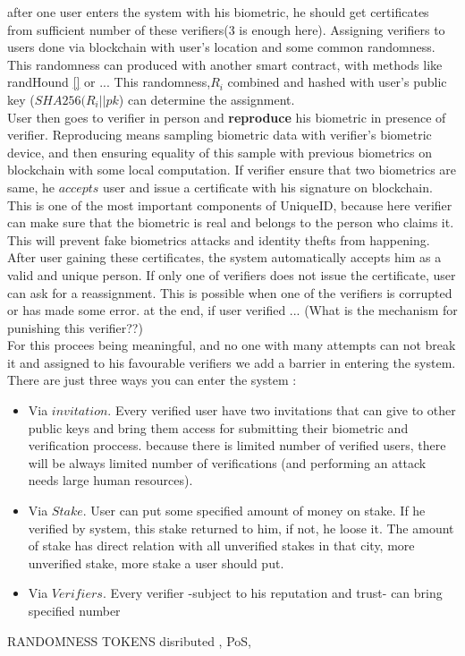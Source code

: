 \documentclass{article}
\begin{document}
 after one user enters the system with his biometric, he should get certificates from sufficient number of these verifiers(3 is enough here). Assigning verifiers to users done via blockchain with user's location and some common randomness. This randomness can produced with another smart contract, with methods like randHound \ref{} or ...   This randomness,$ R_i$ combined and hashed with user's public key ($SHA256(R_i || pk$) can determine the assignment. \\ 
User then goes to verifier in person and \textbf{reproduce}  his biometric in presence of verifier. Reproducing means sampling biometric data with verifier's biometric device, and then ensuring equality of this sample with previous biometrics on blockchain with some local computation. If verifier ensure that two biometrics are same, he $accepts$ user and issue a certificate with his signature on blockchain. This is one of the most important components of UniqueID, because here verifier can make sure that the biometric is real and belongs to the person who claims it. This will prevent fake biometrics attacks and identity thefts from happening.
\\
After user gaining these certificates, the system automatically accepts him  as a valid and unique person. If only one of verifiers does not issue the certificate, user can ask for a reassignment. This is possible when one of the verifiers is corrupted or has made some error. at the end, if user verified ... (What is the mechanism for punishing this verifier??)
\\
For this procees being meaningful, and no one with many attempts can not break it and assigned to his favourable verifiers we add a barrier in entering the system. There are just three ways you can enter the system :
\begin{itemize}
\item Via $invitation$. Every verified user have two invitations that can give to other public keys and bring them access for submitting their biometric and verification proccess. because there is limited number of verified users, there will be always limited number of verifications (and performing an attack needs large human resources).

\item Via $Stake$. User can put some specified amount of money on stake. If he verified by system, this stake returned to him, if not, he loose it. The amount of stake has direct relation with all unverified stakes in that city, more unverified stake, more stake a user should put.

\item Via $Verifiers$. Every verifier -subject to his reputation and trust- can bring specified number  
\end{itemize}
RANDOMNESS TOKENS disributed , PoS, 
\end{document}
